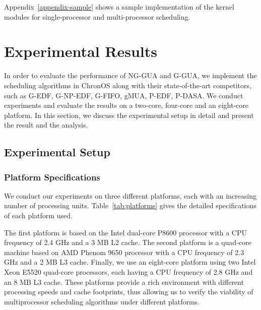 \documentclass[12pt,dvips]{report}
\begin{document}
Appendix~\ref{appendix-sample} shows a sample implementation of the kernel modules for single-processor and multi-processor scheduling.

\chapter{Experimental Results}\label{chap:exp_res}

In order to evaluate the performance of NG-GUA and G-GUA, we implement the scheduling algorithms in ChronOS along with their state-of-the-art competitors, such as G-EDF, G-NP-EDF, G-FIFO, gMUA, P-EDF, P-DASA. We conduct experiments and evaluate the results on a two-core, four-core and an eight-core platform. In this section, we discuss the experimental setup in detail and present the result and the analysis. 

\section{Experimental Setup}\label{sec:evaluation-experimental-setup}
 
\subsection{Platform Specifications}
 
We conduct our experiments on three different platforms, each with an increasing number of processing units. Table~\ref{tab:platforms} gives the detailed specifications of each platform used.

The first platform is based on the Intel dual-core P8600 processor with a CPU frequency of 2.4 GHz and a 3 MB L2 cache. The second platform is a quad-core machine based on AMD Phenom 9650 processor with a CPU frequency of 2.3 GHz and a 2 MB L3 cache. Finally, we use an eight-core platform using two Intel Xeon E5520 quad-core processors, each having a CPU frequency of 2.8 GHz and an 8 MB L3 cache. These platforms provide a rich environment with different processing speeds and cache footprints, thus allowing us to verify the viability of multiprocessor scheduling algorithms under different platforms.
\end{document}
